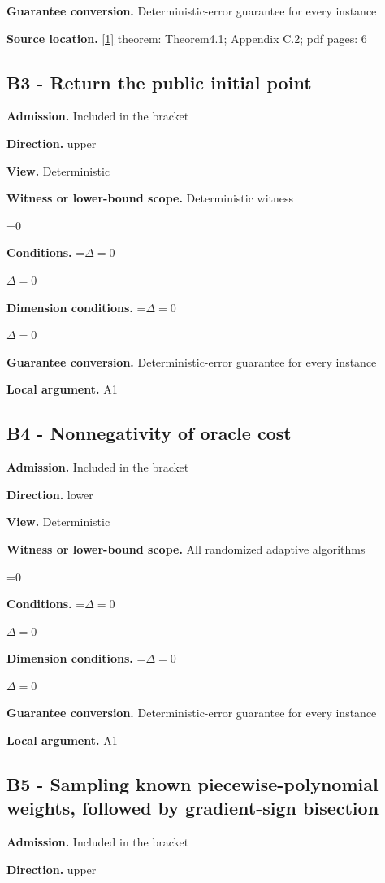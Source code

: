\documentclass[10pt,a4paper]{article}
\newcommand{\AtlasMath}[1]{\par\begingroup\centering\setbox0=\hbox{$\displaystyle #1$}\ifdim\wd0>1.4\linewidth\typeout{ATLAS WIDE FORMULA: \the\wd0}\fi\ifdim\wd0>\linewidth\resizebox{\linewidth}{!}{\box0}\else\box0\fi\par\endgroup}
\newcommand{\AtlasInlineMath}[1]{\begingroup\setbox0=\hbox{$#1$}\ifdim\wd0>.4\linewidth\endgroup\AtlasMath{#1}\else\endgroup$#1$\fi}
\begin{document}
\textbf{Guarantee conversion.} Deterministic-error guarantee for every instance

\textbf{Source location.} \href{https://arxiv.org/abs/2610.16295}{[1]} theorem: Theorem4.1; Appendix C.2; pdf pages: 6

\subsection{B3 - Return the public initial point}
\textbf{Admission.} Included in the bracket

\textbf{Direction.} upper

\textbf{View.} Deterministic

\textbf{Witness or lower-bound scope.} Deterministic witness

\AtlasMath{0}
\textbf{Conditions.} \AtlasInlineMath{\Delta=0}

\textbf{Dimension conditions.} \AtlasInlineMath{\Delta=0}

\textbf{Guarantee conversion.} Deterministic-error guarantee for every instance

\textbf{Local argument.} A1

\subsection{B4 - Nonnegativity of oracle cost}
\textbf{Admission.} Included in the bracket

\textbf{Direction.} lower

\textbf{View.} Deterministic

\textbf{Witness or lower-bound scope.} All randomized adaptive algorithms

\AtlasMath{0}
\textbf{Conditions.} \AtlasInlineMath{\Delta=0}

\textbf{Dimension conditions.} \AtlasInlineMath{\Delta=0}

\textbf{Guarantee conversion.} Deterministic-error guarantee for every instance

\textbf{Local argument.} A1

\subsection{B5 - Sampling known piecewise-polynomial weights, followed by gradient-sign bisection}
\textbf{Admission.} Included in the bracket

\textbf{Direction.} upper
\end{document}
